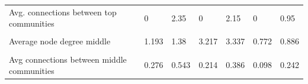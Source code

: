 \documentclass[
]{article}
\begin{document}
\begin{table}
\begin{tabular}[t]{>{\raggedright\arraybackslash}p{8em}llllll}
Avg. connections between top communities & 0 & 2.35 & 0 & 2.15 & 0 & 0.95\\
\cellcolor{gray!10}{Modularity (middle)} & \cellcolor{gray!10}{0.771} & \cellcolor{gray!10}{0.658} & \cellcolor{gray!10}{0.875} & \cellcolor{gray!10}{0.841} & \cellcolor{gray!10}{0.813} & \cellcolor{gray!10}{0.697}\\
Average node degree middle & 1.193 & 1.38 & 3.217 & 3.337 & 0.772 & 0.886\\
\cellcolor{gray!10}{Avg connections within middle communities} & \cellcolor{gray!10}{20} & \cellcolor{gray!10}{20} & \cellcolor{gray!10}{61.333} & \cellcolor{gray!10}{61.333} & \cellcolor{gray!10}{9.667} & \cellcolor{gray!10}{9.667}\\
\addlinespace
Avg connections between middle communities & 0.276 & 0.543 & 0.214 & 0.386 & 0.098 & 0.242\\
\bottomrule
\end{tabular}
\end{table}

\clearpage
\newpage
\end{document}

